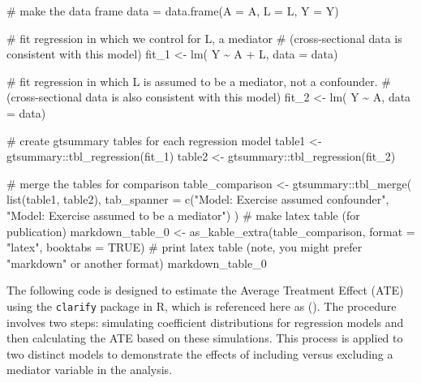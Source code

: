 \documentclass[
  singlecolumn]{article}
\newenvironment{Shaded}{}{}
\newcommand{\AttributeTok}[1]{\textcolor[rgb]{0.84,0.23,0.29}{#1}}
\newcommand{\CommentTok}[1]{\textcolor[rgb]{0.42,0.45,0.49}{#1}}
\newcommand{\ConstantTok}[1]{\textcolor[rgb]{0.00,0.36,0.77}{#1}}
\newcommand{\FunctionTok}[1]{\textcolor[rgb]{0.44,0.26,0.76}{#1}}
\newcommand{\NormalTok}[1]{\textcolor[rgb]{0.14,0.16,0.18}{#1}}
\newcommand{\OtherTok}[1]{\textcolor[rgb]{0.44,0.26,0.76}{#1}}
\newcommand{\SpecialCharTok}[1]{\textcolor[rgb]{0.00,0.36,0.77}{#1}}
\newcommand{\StringTok}[1]{\textcolor[rgb]{0.01,0.18,0.38}{#1}}
\begin{document}
\begin{Shaded}
\begin{Highlighting}[]
\CommentTok{\# make the data frame}
\NormalTok{data }\OtherTok{=} \FunctionTok{data.frame}\NormalTok{(}\AttributeTok{A =}\NormalTok{ A, }\AttributeTok{L =}\NormalTok{ L, }\AttributeTok{Y =}\NormalTok{ Y)}

\CommentTok{\# fit regression in which we control for L, a mediator}
\CommentTok{\# (cross{-}sectional data is consistent with this model)}
\NormalTok{fit\_1 }\OtherTok{\textless{}{-}} \FunctionTok{lm}\NormalTok{( Y }\SpecialCharTok{\textasciitilde{}}\NormalTok{ A }\SpecialCharTok{+}\NormalTok{ L, }\AttributeTok{data =}\NormalTok{ data)}

\CommentTok{\# fit regression in which L is assumed to be a mediator, not a confounder.}
\CommentTok{\# (cross{-}sectional data is also consistent with this model)}
\NormalTok{fit\_2 }\OtherTok{\textless{}{-}} \FunctionTok{lm}\NormalTok{( Y }\SpecialCharTok{\textasciitilde{}}\NormalTok{ A, }\AttributeTok{data =}\NormalTok{ data)}

\CommentTok{\# create gtsummary tables for each regression model}
\NormalTok{table1 }\OtherTok{\textless{}{-}}\NormalTok{ gtsummary}\SpecialCharTok{::}\FunctionTok{tbl\_regression}\NormalTok{(fit\_1)}
\NormalTok{table2 }\OtherTok{\textless{}{-}}\NormalTok{ gtsummary}\SpecialCharTok{::}\FunctionTok{tbl\_regression}\NormalTok{(fit\_2)}

\CommentTok{\# merge the tables for comparison}
\NormalTok{table\_comparison }\OtherTok{\textless{}{-}}\NormalTok{ gtsummary}\SpecialCharTok{::}\FunctionTok{tbl\_merge}\NormalTok{(}
  \FunctionTok{list}\NormalTok{(table1, table2),}
  \AttributeTok{tab\_spanner =} \FunctionTok{c}\NormalTok{(}\StringTok{"Model: Exercise assumed confounder"}\NormalTok{, }
                  \StringTok{"Model: Exercise assumed to be a mediator"}\NormalTok{)}
\NormalTok{)}
\CommentTok{\# make latex table (for publication)}
\NormalTok{markdown\_table\_0 }\OtherTok{\textless{}{-}} \FunctionTok{as\_kable\_extra}\NormalTok{(table\_comparison, }
                                   \AttributeTok{format =} \StringTok{"latex"}\NormalTok{, }
                                   \AttributeTok{booktabs =} \ConstantTok{TRUE}\NormalTok{)}
\CommentTok{\# print latex table (note, you might prefer "markdown" or another format)                                }
\NormalTok{markdown\_table\_0}
\end{Highlighting}
\end{Shaded}

The following code is designed to estimate the Average Treatment Effect
(ATE) using the \texttt{clarify} package in R, which is referenced here
as (). The
procedure involves two steps: simulating coefficient distributions for
regression models and then calculating the ATE based on these
simulations. This process is applied to two distinct models to
demonstrate the effects of including versus excluding a mediator
variable in the analysis.
\end{document}
